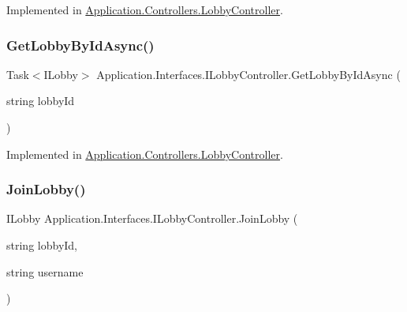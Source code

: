 Implemented in \mbox{\hyperlink{class_application_1_1_controllers_1_1_lobby_controller_a5ea797c6456dc8d40e16b87077a16693}{Application.\+Controllers.\+Lobby\+Controller}}.

\mbox{\label{interface_application_1_1_interfaces_1_1_i_lobby_controller_abe3ce90e900391a0c4ffa25195800ab2}} 
\subsubsection{\texorpdfstring{Get\+Lobby\+By\+Id\+Async()}{GetLobbyByIdAsync()}}
{\footnotesize\ttfamily Task$<$I\+Lobby$>$ Application.\+Interfaces.\+I\+Lobby\+Controller.\+Get\+Lobby\+By\+Id\+Async (\begin{DoxyParamCaption}\item[{string}]{lobby\+Id }\end{DoxyParamCaption})}



Implemented in \mbox{\hyperlink{class_application_1_1_controllers_1_1_lobby_controller_afe14da64961a1667fd7411484204c692}{Application.\+Controllers.\+Lobby\+Controller}}.

\mbox{\label{interface_application_1_1_interfaces_1_1_i_lobby_controller_a17c37ec6dbb98ab07deb4e4f9800a68e}} 
\subsubsection{\texorpdfstring{Join\+Lobby()}{JoinLobby()}}
{\footnotesize\ttfamily I\+Lobby Application.\+Interfaces.\+I\+Lobby\+Controller.\+Join\+Lobby (\begin{DoxyParamCaption}\item[{string}]{lobby\+Id,  }\item[{string}]{username }\end{DoxyParamCaption})}




